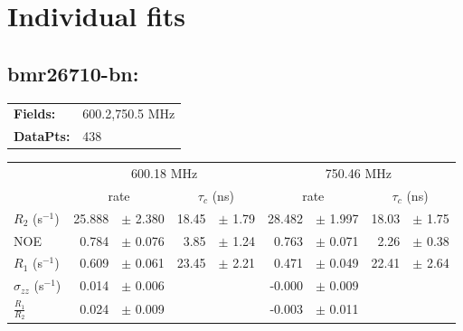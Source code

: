 \documentclass[showkeys,aps,prb,prepreint,amssymb, amsmath,nobibnotes]{article}
\begin{document}
\section{Individual fits}

\noindent \subsection{bmr26710-bn: }

\begin{tabular}{ll}
\textbf{Fields:} &  600.2,750.5 MHz\\
\textbf{DataPts:} &  438\\
\end{tabular}

\begin{small}
\noindent \begin{tabular}{l|rlrl|rlrl}
& \multicolumn{4}{c}{600.18 MHz}& \multicolumn{4}{c}{750.46 MHz}\\
&  \multicolumn{2}{c}{rate} & \multicolumn{2}{c}{$\tau_c$ (ns)}   &  \multicolumn{2}{c}{rate} & \multicolumn{2}{c}{$\tau_c$ (ns)}   \\
\hline$R_2$  (s$^{-1}$)  &  25.888 & $\pm$ 2.380   &  18.45 & $\pm$ 1.79 &  28.482 & $\pm$ 1.997   &  18.03 & $\pm$ 1.75 \\
NOE  &  0.784 & $\pm$ 0.076   &  3.85 & $\pm$ 1.24 &  0.763 & $\pm$ 0.071   &  2.26 & $\pm$ 0.38 \\
$R_1$ (s$^{-1}$)  &  0.609 & $\pm$ 0.061   &  23.45 & $\pm$ 2.21 &  0.471 & $\pm$ 0.049   &  22.41 & $\pm$ 2.64 \\
$\sigma_{zz}$  (s$^{-1}$)  &  0.014 & $\pm$ 0.006   & & &  -0.000 & $\pm$ 0.009   & & \\
$\frac{R_1}{R_2}$  &  0.024 & $\pm$ 0.009   & & &  -0.003 & $\pm$ 0.011   & & \\
\end{tabular}
\end{small}
\end{document}
